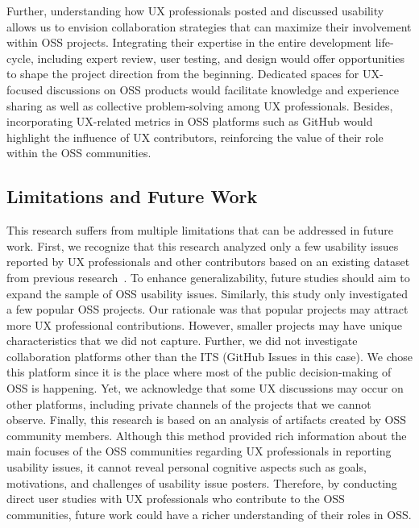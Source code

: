 Further, understanding how UX professionals posted and discussed usability allows us to envision collaboration strategies that can maximize their involvement within OSS projects. Integrating their expertise in the entire development life-cycle, including expert review, user testing, and design would offer opportunities to shape the project direction from the beginning. Dedicated spaces for UX-focused discussions on OSS products would facilitate knowledge and experience sharing as well as collective problem-solving among UX professionals. Besides, incorporating UX-related metrics in OSS platforms such as GitHub would highlight the influence of UX contributors, reinforcing the value of their role within the OSS communities.

\subsection{Limitations and Future Work}
This research suffers from multiple limitations that can be addressed in future work. First, we recognize that this research analyzed only a few usability issues reported by UX professionals and other contributors based on an existing dataset from previous research~\cite{sanei2023characterizing}. To enhance generalizability, future studies should aim to expand the sample of OSS usability issues. Similarly, this study only investigated a few popular OSS projects. Our rationale was that popular projects may attract more UX professional contributions. However, smaller projects may have unique characteristics that we did not capture. Further, we did not investigate collaboration platforms other than the ITS (GitHub Issues in this case). We chose this platform since it is the place where most of the public decision-making of OSS is happening. Yet, we acknowledge that some UX discussions may occur on other platforms, including private channels of the projects that we cannot observe. Finally, this research is based on an analysis of artifacts created by OSS community members. Although this method provided rich information about the main focuses of the OSS communities regarding UX professionals in reporting usability issues, it cannot reveal personal cognitive aspects such as goals, motivations, and challenges of usability issue posters. Therefore, by conducting direct user studies with UX professionals who contribute to the OSS communities, future work could have a richer understanding of their roles in OSS.

